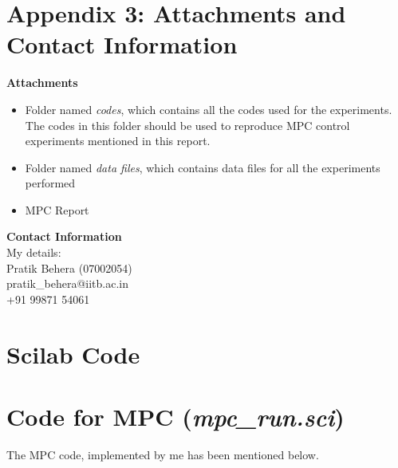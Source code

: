 \section{Appendix 3: Attachments and Contact Information}
\textbf{Attachments}
\begin{itemize}
\item Folder named \emph{codes}, which contains all the codes used for the experiments. The codes in this folder should be used to reproduce MPC control experiments mentioned in this report.
\item Folder named \emph{data files}, which contains data files for all the experiments performed
\item MPC Report
\end{itemize}
\textbf{Contact Information} \\
My details: \\
Pratik Behera (07002054) \\
pratik\_behera@iitb.ac.in \\
+91 99871 54061

\section{Scilab Code}\label{mpccodes}
\section{Code for MPC (\emph{mpc\_run.sci})}
The MPC code, implemented by me has been mentioned below.


\begin{code}

\end{code}\

\begin{code}

\end{code}

\begin{code}

\end{code}

\begin{code}

\end{code}


